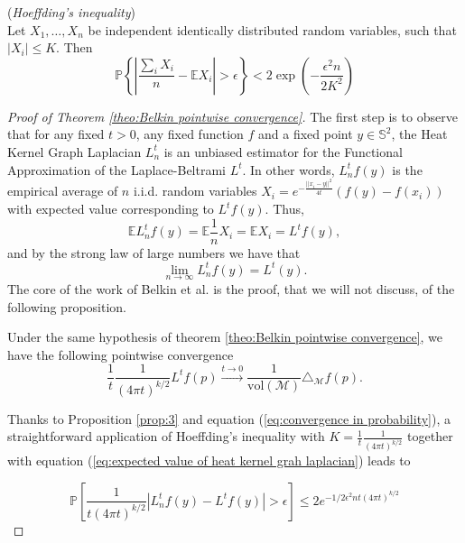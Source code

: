 (\textit{Hoeffding's inequality})\\
Let \(X_{1}, \ldots, X_{n}\) be independent identically distributed random variables, such that
\(\left|X_{i}\right| \leqslant K .\) Then
\begin{equation}\label{eq:Hoeffding}
\mathbb P\left\{\left|\frac{\sum_{i} X_{i}}{n}-\mathbb{E} X_{i}\right|>\epsilon\right\}<2 \exp \left(-\frac{\epsilon^{2} n}{2 K^{2}}\right)
\end{equation}

\begin{proof}[Proof of Theorem \ref{theo:Belkin pointwise convergence}]
 The first step is to observe that for any fixed $t>0$, any fixed function $f$ and a fixed point $y\in\mathbb S^2$,  the Heat Kernel Graph Laplacian $L_n^t$ is an unbiased estimator for the Functional Approximation of the Laplace-Beltrami $L^t$. In other words, $L_n^tf(y)$ is the empirical average of $n$ i.i.d. random variables $X_i= e^{-\frac{||x_i-y||^2}{4t}}\left(f(y)-f(x_i)\right)$ with expected value corresponding to $L^tf(y)$. Thus,
\begin{equation}
\label{eq:expected value of heat kernel grah laplacian}
	\mathbb E L_n^tf(y) = 	\mathbb E \frac{1}{n}X_i = \mathbb E X_i = L^tf(y),
\end{equation}
and by the strong law of large numbers we have that
\begin{equation}
\label{eq:convergence in probability}
\lim_{n\to\infty}L_n^tf(y) = L^t(y).
\end{equation}
The core of the work of Belkin et al. is the proof, that we will not discuss, of the following proposition.

\begin{prop} Under the same hypothesis of theorem \ref{theo:Belkin pointwise convergence}, we have the following pointwise convergence
	$$\frac{1}{t}\frac{1}{(4\pi t)^{k/2}} L^tf(p) \xrightarrow{t\to 0 } \frac{1}{\text{vol}(\mathcal M)}\triangle_{\mathcal M}f(p).$$
	\label{prop:3}
\end{prop}
Thanks to Proposition \ref{prop:3} and equation (\ref{eq:convergence in probability}), a straightforward application of Hoeffding's inequality with $K=\frac{1}{t}\frac{1}{(4\pi t)^{k/2}}$ together with equation  (\ref{eq:expected value of heat kernel grah laplacian}) leads to

\begin{equation}
	\label{eq:hoeffding applied}
	\mathbb{P}\left[\frac{1}{t(4 \pi t)^{k / 2}}\left|L_{n}^{t} f(y)- L^{t} f(y)\right|>\epsilon\right] \leq 2 e^{-1 / 2 \epsilon^{2} n t(4 \pi t)^{k / 2}}
\end{equation}


\end{proof}
